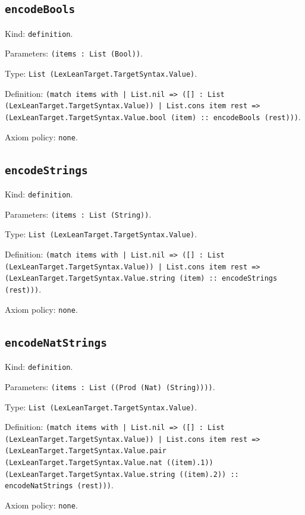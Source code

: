 \documentclass[11pt]{article}
\begin{document}
\subsection*{\texttt{encodeBools}}
\noindent Kind: \texttt{definition}.\par
\noindent Parameters: \texttt{(items : List (Bool))}.\par
\noindent Type: \texttt{List (LexLeanTarget.TargetSyntax.Value)}.\par
\noindent Definition: \texttt{(match items with | List.nil => ([] : List (LexLeanTarget.TargetSyntax.Value)) | List.cons item rest => (LexLeanTarget.TargetSyntax.Value.bool (item) :: encodeBools (rest)))}.\par
\noindent Axiom policy: \texttt{none}.\par
\subsection*{\texttt{encodeStrings}}
\noindent Kind: \texttt{definition}.\par
\noindent Parameters: \texttt{(items : List (String))}.\par
\noindent Type: \texttt{List (LexLeanTarget.TargetSyntax.Value)}.\par
\noindent Definition: \texttt{(match items with | List.nil => ([] : List (LexLeanTarget.TargetSyntax.Value)) | List.cons item rest => (LexLeanTarget.TargetSyntax.Value.string (item) :: encodeStrings (rest)))}.\par
\noindent Axiom policy: \texttt{none}.\par
\subsection*{\texttt{encodeNatStrings}}
\noindent Kind: \texttt{definition}.\par
\noindent Parameters: \texttt{(items : List ((Prod (Nat) (String))))}.\par
\noindent Type: \texttt{List (LexLeanTarget.TargetSyntax.Value)}.\par
\noindent Definition: \texttt{(match items with | List.nil => ([] : List (LexLeanTarget.TargetSyntax.Value)) | List.cons item rest => (LexLeanTarget.TargetSyntax.Value.pair (LexLeanTarget.TargetSyntax.Value.nat ((item).1)) (LexLeanTarget.TargetSyntax.Value.string ((item).2)) :: encodeNatStrings (rest)))}.\par
\noindent Axiom policy: \texttt{none}.\par
\end{document}
